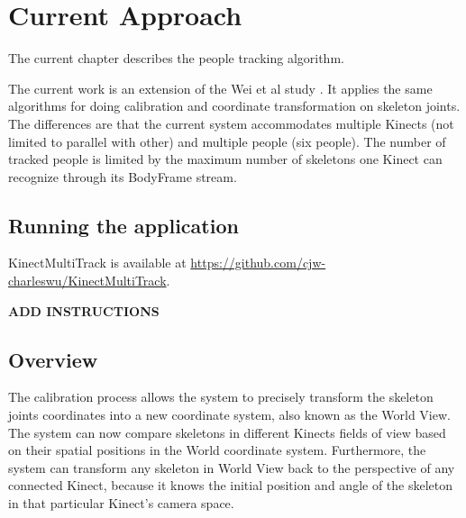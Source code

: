 


\chapter{Current Approach}

\label{chapter:current_appraoch}

The current chapter describes the people tracking algorithm.

The current work is an extension of the Wei et al study \cite{wei_kinect_calibration}. It applies the same algorithms for doing calibration and coordinate transformation on skeleton joints. The differences are that the current system accommodates multiple Kinects (not limited to parallel with other) and multiple people (six people). The number of tracked people is limited by the maximum number of skeletons one Kinect can recognize through its BodyFrame stream.

\section{Running the application}
\label{sec:current_approach_running_application}

KinectMultiTrack is available at \url{https://github.com/cjw-charleswu/KinectMultiTrack}.

\textbf{ADD INSTRUCTIONS}

\section{Overview}
\label{sec:current_approach_overview}


The calibration process allows the system to precisely transform the skeleton joints coordinates into a new coordinate system, also known as the World View. The system can now compare skeletons in different Kinects fields of view based on their spatial positions in the World coordinate system. Furthermore, the system can transform any skeleton in World View back to the perspective of any connected Kinect, because it knows the initial position and angle of the skeleton in that particular Kinect's camera space.

